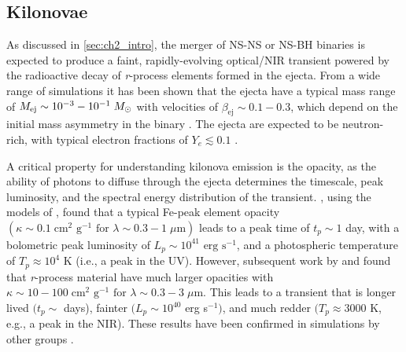 \subsection{Kilonovae}
\label{sec:ch2_kilo}
As discussed in \cref{sec:ch2_intro}, the merger of NS-NS or NS-BH binaries is expected to produce a faint, rapidly-evolving optical/NIR transient powered by the radioactive decay of {\em r}-process elements formed in the ejecta. From a wide range of simulations it has been shown that the ejecta have a typical mass range of $M_{\rm ej} \sim 10^{-3}-10^{-1} \; M_{\odot}$ with velocities of $\beta_{\text{ej}} \sim 0.1-0.3$, which depend on the initial mass asymmetry in the binary \citep{Rosswog+99,Rosswog2005,Bauswein+13a,Rosswog+13}. The ejecta are expected to be neutron-rich, with typical electron fractions of $Y_e \lesssim 0.1$ \citep{Metzger+10}.

A critical property for understanding kilonova emission is the opacity, as the ability of photons to diffuse through the ejecta determines the timescale, peak luminosity, and the spectral energy distribution of the transient. \citet{Metzger+10}, using the models of \citep[LP98 hereafter]{LP98}, found that a typical Fe-peak element opacity $(\kappa \sim 0.1 \; \text{cm}^2 \text{ g}^{-1} \text{ for } \lambda \sim 0.3 - 1\; \mu\text{m})$ leads to a peak time of $t_p \sim 1$ day, with a bolometric peak luminosity of $L_p \sim 10^{41} \text{ erg s}^{-1}$, and a photospheric temperature of $T_p \approx 10^4$ K (i.e., a peak in the UV). However, subsequent work by \citet{Kasen+13} and \citet{BarnesKasen13} found that {\em r}-process material have much larger opacities with $\kappa \sim 10-100 \; \text{cm}^2 \text{ g}^{-1} \text{ for } \lambda \sim 0.3 - 3\; \mu\text{m}$. This leads to a transient that is longer lived $(t_p \sim$ days), fainter $(L_p \sim 10^{40}$ erg s$^{-1})$, and much redder $(T_p \approx 3000$ K, e.g., a peak in the NIR). These results have been confirmed in simulations by other groups \citep[see e.g.,][]{TanakaHotokezaka13,Grossman+14,Tanaka+14}.


